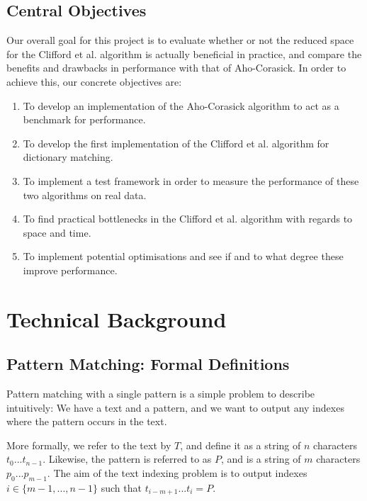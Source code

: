 \documentclass[ %
                    author={Dominic Joseph Moylett},
                    degree={MEng},
                     title={Dictionary Matching with Fingerprints},
                  subtitle={An Empirical Analysis},
                      type={research},
                      year={2015} ]{dissertation}
\begin{document}
\section{Central Objectives}

Our overall goal for this project is to evaluate whether or not the reduced space for the Clifford et al. algorithm is actually beneficial in practice, and compare the benefits and drawbacks in performance with that of Aho-Corasick. In order to achieve this, our concrete objectives are:

\begin{enumerate}
  \item To develop an implementation of the Aho-Corasick algorithm to act as a benchmark for performance.
  \item To develop the first implementation of the Clifford et al. algorithm for dictionary matching.
  \item To implement a test framework in order to measure the performance of these two algorithms on real data.
  \item To find practical bottlenecks in the Clifford et al. algorithm with regards to space and time.
  \item To implement potential optimisations and see if and to what degree these improve performance.
\end{enumerate}


\chapter{Technical Background}
\label{chap:technical}

\section{Pattern Matching: Formal Definitions}

Pattern matching with a single pattern is a simple problem to describe intuitively: We have a text and a pattern, and we want to output any indexes where the pattern occurs in the text.

More formally, we refer to the text by $T$, and define it as a string of $n$ characters $t_0...t_{n-1}$. Likewise, the pattern is referred to as $P$, and is a string of $m$ characters $p_0...p_{m-1}$. The aim of the text indexing problem is to output indexes $i \in \{m-1,...,n-1\}$ such that $t_{i-m+1}...t_{i} = P$.
\end{document}
